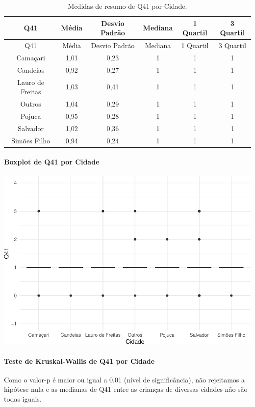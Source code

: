\documentclass[]{article}
\let\oldparagraph\paragraph
\renewcommand{\paragraph}[1]{\oldparagraph{#1}\mbox{}}
\begin{document}
\begin{longtable}[]{@{}cccccc@{}}
\caption{\label{tab:unnamed-chunk-1609}Medidas de resumo de Q41 por Cidade.}\tabularnewline
\toprule
Q41 & Média & Desvio Padrão & Mediana & 1 Quartil & 3 Quartil\tabularnewline
\midrule
\endfirsthead
\toprule
Q41 & Média & Desvio Padrão & Mediana & 1 Quartil & 3 Quartil\tabularnewline
\midrule
\endhead
Camaçari & 1,01 & 0,23 & 1 & 1 & 1\tabularnewline
Candeias & 0,92 & 0,27 & 1 & 1 & 1\tabularnewline
Lauro de Freitas & 1,03 & 0,41 & 1 & 1 & 1\tabularnewline
Outros & 1,04 & 0,29 & 1 & 1 & 1\tabularnewline
Pojuca & 0,95 & 0,28 & 1 & 1 & 1\tabularnewline
Salvador & 1,02 & 0,36 & 1 & 1 & 1\tabularnewline
Simões Filho & 0,94 & 0,24 & 1 & 1 & 1\tabularnewline
\bottomrule
\end{longtable}

\hypertarget{boxplot-de-q41-por-cidade}{%
\paragraph{Boxplot de Q41 por Cidade}\label{boxplot-de-q41-por-cidade}}

\begin{center}\includegraphics[width=0.75\linewidth]{relatorio_covid19_files/figure-latex/unnamed-chunk-1610-1} \end{center}

\hypertarget{teste-de-kruskal-wallis-de-q41-por-cidade}{%
\paragraph{Teste de Kruskal-Wallis de Q41 por Cidade}\label{teste-de-kruskal-wallis-de-q41-por-cidade}}

Como o valor-p é maior ou igual a 0.01 (nível de significância), não rejeitamos a hipótese nula e as medianas de Q41 entre as crianças de diversas cidades não são todas iguais.
\end{document}
